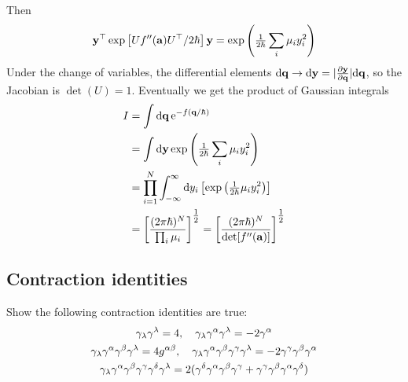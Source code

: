 \documentclass[10pt]{article}
\begin{document}
Then
\begin{equation}
	{\bf y}^\top \exp\left[Uf''({\bf a})U^\top/2\hbar\right] {\bf y} = \exp\left(\tfrac{1}{2\hbar} \sum_i \mu_i y_i^2\right)
\end{equation}
Under the change of variables, the differential elements $\dd \bfq \to \dd \bfy = |\tfrac{\partial \bfy}{\partial \bfq}| \dd \bfq$, so the Jacobian is $\det(U) = 1$. Eventually we get the  product of Gaussian integrals
\begin{align*}
	I &= \int \dd \bfq \, \e^{-f(\bfq/\hbar)}\\
	&= \int \dd \bfy \exp\left(\tfrac{1}{2\hbar} \sum_i \mu_i y_i^2\right) \\
	&= \prod_{i=1}^N \int_{-\infty}^{\infty} \dd y_i \left[ \exp\left(\tfrac{1}{2\hbar} \mu_i y_i^2\right) \right] \\
	&= \left[ \frac{(2\pi \hbar)^N}{\prod_i \mu_i} \right]^{\thalf} = \left[ \frac{(2\pi \hbar)^N}{\det[f''(\bfa)]} \right]^{\thalf}
\end{align*}

\subsection{Contraction identities}

Show the following contraction identities are true:
\begin{gather*}
	\gamma_{\lambda} \gamma^{\lambda} = 4\qc \gamma_{\lambda} \gamma^{\alpha} \gamma^{\lambda} = -2 \gamma^{\alpha} \\
	\gamma_{\lambda} \gamma^{\alpha} \gamma^{\beta} \gamma^{\lambda} = 4 g^{\alpha \beta}\qc \gamma_{\lambda} \gamma^{\alpha} \gamma^{\beta} \gamma^{\gamma} \gamma^{\lambda} = -2 \gamma^{\gamma} \gamma^{\beta} \gamma^{\alpha} \\
	\gamma_{\lambda} \gamma^{\alpha} \gamma^{\beta} \gamma^{\gamma} \gamma^{\delta} \gamma^{\lambda} = 2(\gamma^{\delta} \gamma^{\alpha} \gamma^{\beta} \gamma^{\gamma} + \gamma^{\gamma} \gamma^{\beta} \gamma^{\alpha} \gamma^{\delta})
\end{gather*}
\end{document}
